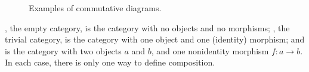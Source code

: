 \begin{remark}
\begin{figure}[htbp]
\begin{subfigure}{0.5\linewidth}
\begin{center}
      \end{center}
      \caption{}
      \label{fig:commutative-squares}
    \end{subfigure}
    \caption{Examples of commutative diagrams.}
    \label{fig:commutative-diagrams}
  \end{figure}

\end{remark}

\begin{example}



  \label{ex:trivial-categories}

  , the empty category, is the category with no objects and
  no morphisms; , the trivial category, is the category with
  one object and one (identity) morphism; and  is the
  category with two objects $a$ and $b$, and one nonidentity morphism
  $f: a \to b$. In each case, there is only one way to define
  composition.


\end{example}

